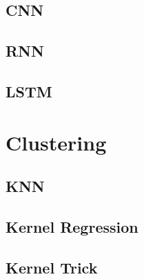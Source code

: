 \documentclass[18pt,a3paper,landscape, ncols=3]{cheatsheet}
\begin{document}
	\subsection{CNN}
		\begin{mdframed}
			\vspace{15mm}
		\end{mdframed}
	\subsection{RNN}
		\begin{mdframed}
			\vspace{15mm}
		\end{mdframed}
	\subsection{LSTM}
		\begin{mdframed}
			\vspace{15mm}
		\end{mdframed}

\section{Clustering} \seperator %
	\subsection{KNN}
		\begin{mdframed}
			\vspace{10mm}
		\end{mdframed}
		\begin{mdframed}
			\vspace{15mm}
		\end{mdframed}
	\subsection{Kernel Regression}
		\begin{mdframed}
			\vspace{10mm}
		\end{mdframed}
		\begin{mdframed}
			\vspace{15mm}
		\end{mdframed}
	\subsection{Kernel Trick}
		\begin{mdframed}
			\vspace{15mm}
		\end{mdframed}

\end{document}
